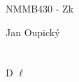 \documentclass[12pt, a4paper]{article}
\begin{document}
\begin{center}
\large NMMB430 - Zk

\normalsize Jan Oupický
\end{center}
\vspace{1\baselineskip}

\section{}
D $\ell$
\end{document}
